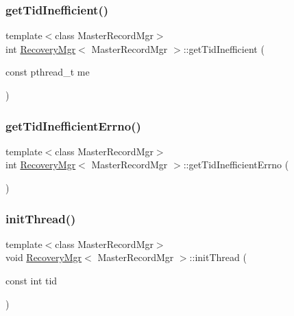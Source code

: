 \mbox{\label{classRecoveryMgr_a66bc99f5748e8418e9f111416d44dcac}} 
\subsubsection{\texorpdfstring{get\+Tid\+Inefficient()}{getTidInefficient()}}
{\footnotesize\ttfamily template$<$class Master\+Record\+Mgr$>$ \\
int \hyperlink{classRecoveryMgr}{Recovery\+Mgr}$<$ Master\+Record\+Mgr $>$\+::get\+Tid\+Inefficient (\begin{DoxyParamCaption}\item[{const pthread\+\_\+t}]{me }\end{DoxyParamCaption})\hspace{0.3cm}{\ttfamily [inline]}}

\mbox{\label{classRecoveryMgr_a5917bf180cc6917ebb903a218d163aef}} 
\subsubsection{\texorpdfstring{get\+Tid\+Inefficient\+Errno()}{getTidInefficientErrno()}}
{\footnotesize\ttfamily template$<$class Master\+Record\+Mgr$>$ \\
int \hyperlink{classRecoveryMgr}{Recovery\+Mgr}$<$ Master\+Record\+Mgr $>$\+::get\+Tid\+Inefficient\+Errno (\begin{DoxyParamCaption}{ }\end{DoxyParamCaption})\hspace{0.3cm}{\ttfamily [inline]}}

\mbox{\label{classRecoveryMgr_ad68f80af5f2371e66a39fed826f27c93}} 
\subsubsection{\texorpdfstring{init\+Thread()}{initThread()}}
{\footnotesize\ttfamily template$<$class Master\+Record\+Mgr$>$ \\
void \hyperlink{classRecoveryMgr}{Recovery\+Mgr}$<$ Master\+Record\+Mgr $>$\+::init\+Thread (\begin{DoxyParamCaption}\item[{const int}]{tid }\end{DoxyParamCaption})\hspace{0.3cm}{\ttfamily [inline]}}

